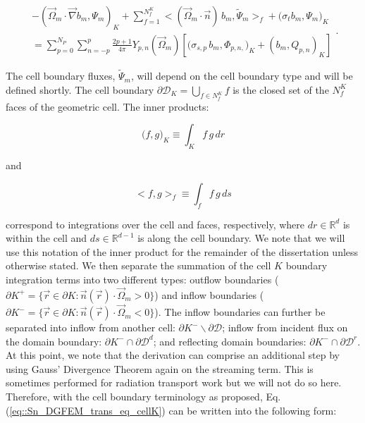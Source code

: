 \begin{equation}
\label{eq::Sn_DGFEM_trans_eq_cellK}
\begin{aligned}
- \left( \vec{\Omega}_m \cdot  \vec{\nabla} b_m, \Psi_{m} \right)_{K} + \sum_{f=1}^{N_f^K} \Big< ( \vec{\Omega}_m \cdot \vec{n} ) \, b_m, \tilde{\Psi}_m  \Big>_{f}  + \Big(  \sigma_{t} b_m ,   \Psi_{m} \Big)_{K} \\
= \sum_{p=0}^{N_P} \sum_{n=-p}^{p} \frac{2p + 1}{4 \pi}  Y_{p,n} (  \vec{\Omega}_m ) \left[ \Big( \sigma_{s,p} \, b_m,  \Phi_{p,n,} \Big)_{K}  + \left(  b_m ,   Q_{p,n} \right)_{K} \right]
\end{aligned} .
\end{equation}

\noindent The cell boundary fluxes, $\tilde{\Psi}_m$, will depend on the cell boundary type and will be defined shortly. The cell boundary $\partial \mathcal{D}_K = \bigcup_{ f \in N_f^K} f$ is the closed set of the $N_f^K$ faces of the geometric cell. The inner products:

\begin{equation}
\label{eq::Sn_spatial_inner_products_cell}
 \Big( f, g \Big)_K \equiv \int_K f \, g \, d r
\end{equation} 

\noindent and

\begin{equation}
\label{eq::Sn_spatial_inner_products_face}
 \Big< f, g \Big>_f \equiv \int_f f \, g \, d s
\end{equation}

\noindent correspond to integrations over the cell and faces, respectively, where $dr \in \mathbb{R}^d$ is within the cell and $ds \in \mathbb{R}^{d-1}$ is along the cell boundary. We note that we will use this notation of the inner product for the remainder of the dissertation unless otherwise stated. We then separate the summation of the cell $K$ boundary integration terms into two different types: outflow boundaries ($\partial K^+ = \{  \vec{r} \in \partial K: \vec{n} (\vec{r}) \cdot \vec{\Omega}_m > 0 \}$) and inflow boundaries ($\partial K^- = \{  \vec{r} \in \partial K: \vec{n} (\vec{r}) \cdot \vec{\Omega}_m < 0 \}$). The inflow boundaries can further be separated into inflow from another cell: $\partial K^- \backslash \partial \mathcal{D} $; inflow from incident flux on the domain boundary: $\partial K^- \cap \partial \mathcal{D}^d $; and reflecting domain boundaries: $\partial K^- \cap \partial \mathcal{D}^r $. At this point, we note that the derivation can comprise an additional step by using Gauss' Divergence Theorem again on the streaming term. This is sometimes performed for radiation transport work but we will not do so here. Therefore, with the cell boundary terminology as proposed, Eq. (\ref{eq::Sn_DGFEM_trans_eq_cellK}) can be written into the following form:

